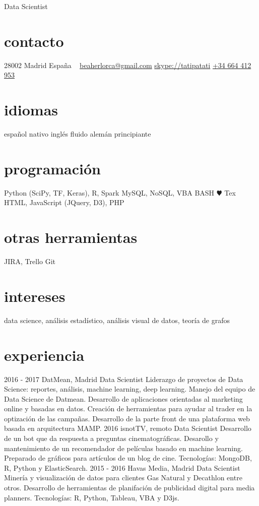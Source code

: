 \documentclass[]{friggeri-cv}
\begin{document}
\else

       {Data Scientist}


\begin{aside}
  \section{contacto}
    28002 Madrid
    España
    ~
    \href{mailto:beaherlorca@gmail.com}{beaherlorca@gmail.com}
    \href{skype:<tatipatati>[add]}{skype://tatipatati}
    \href{tel:0034664412953}{+34 664 412 953}
  \section{idiomas}
    español nativo
    inglés fluido
    alemán principiante
  \section{programación}
    Python (SciPy, TF, Keras), R, Spark
    MySQL, NoSQL, VBA
    BASH
    {\color{red} $\varheartsuit$} Tex
    HTML, JavaScript (JQuery, D3), PHP
  \section{otras herramientas}
    JIRA, Trello
    Git
\end{aside}

\section{intereses}

data science, análisis estadístico, análisis visual de datos, teoría de grafos

\section{experiencia}

\begin{entrylist}
    \entry
    {2016 - 2017}
    {DatMean, Madrid}
    {Data Scientist}
    {Liderazgo de proyectos de Data Science: reportes, análisis, machine learning, deep learning. Manejo del equipo de Data Science de Datmean. Desarrollo de aplicaciones orientadas al marketing online y basadas en datos. Creación de herramientas para ayudar al trader en la optización de las campañas. Desarrollo de la parte front de una plataforma web basada en arquitectura MAMP.}
  \entry
    {2016}
    {isnotTV, remoto}
    {Data Scientist}
    {Desarrollo de un bot que da respuesta a preguntas cinematográficas. Desarollo y mantenimiento de un recomendador de películas basado en machine learning. Preparado de gráficos para artículos de un blog de cine. Tecnologías: MongoDB, R, Python y ElasticSearch.}
  \entry
    {2015 - 2016}
    {Havas Media, Madrid}
    {Data Scientist}
    {Minería y visualización de datos para clientes Gas Natural y Decathlon entre otros. Desarrollo de herramientas de planifación de publicidad digital para media planners. Tecnologías: R, Python, Tableau, VBA y D3js.}
\end{entrylist}
\end{document}
